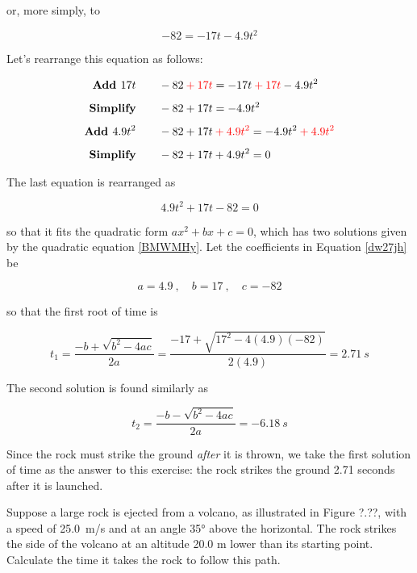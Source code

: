 \documentclass{article}
\begin{document}
or, more simply, to

\begin{equation*}
     -82 = - 17 t -4.9 t^2
\end{equation*}

Let's rearrange this equation as follows:

\begin{align*}
    \textbf{Add $17t$} \qquad & - 82 \mathbin{\color{red} +} \textcolor{red}{17t} = -17t \mathbin{\color{red} +} \textcolor{red}{17t} - 4.9 t^2 \\[1ex]
    \textbf{Simplify} \qquad & -82 + 17t = -4.9t^2\\[1ex]
    \textbf{Add $4.9 t^2$} \qquad & -82 + 17t \mathbin{\color{red} +} \textcolor{red}{4.9 t^2} = -4.9t^2 \mathbin{\color{red} +} \textcolor{red}{4.9 t^2}\\[1ex]
    \textbf{Simplify} \qquad & -82 + 17t + 4.9t^2 = 0
\end{align*}

The last equation is rearranged as 

\begin{equation} \label{dw27jh}
    4.9 t^2 + 17t - 82 = 0
\end{equation}

so that it fits the quadratic form $ax^2 + bx + c = 0$, which has two solutions given by the quadratic equation \eqref{BMWMHy}. Let the coefficients in Equation \eqref{dw27jh} be

\begin{equation*}
    a = 4.9\ , \quad b = 17\ ,\quad c = -82
\end{equation*}

so that the first root of time is

\begin{equation*}
    t_1 = \frac{-b + \sqrt{b^2 - 4ac}}{2a} = \frac{-17 + \sqrt{17^2 - 4(4.9)(-82)}}{2(4.9)} = \SI{2.71}{s}
\end{equation*}

The second solution is found similarly as

\begin{equation*}
    t_2 = \frac{-b - \sqrt{b^2 - 4ac}}{2a} = \SI{-6.18}{s}
\end{equation*}

Since the rock must strike the ground \textit{after} it is thrown, we take the first solution of time as the answer to this exercise: the rock strikes the ground 2.71 seconds after it is launched. 

\endsolution

\begin{example}
    Suppose a large rock is ejected from a volcano, as illustrated in Figure ?.??, with a speed of  \SI{25.0}{m/s} and at an angle \ang{35} above the horizontal. The rock strikes the side of the volcano at an altitude 20.0 m lower than its starting point. Calculate the time it takes the rock to follow this path.
\end{example}
\end{document}
